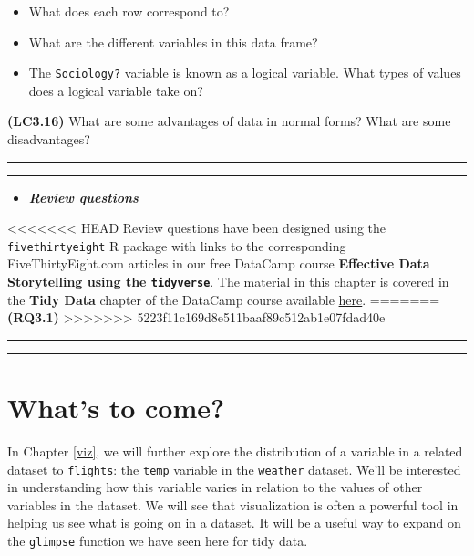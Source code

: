 \documentclass[]{tufte-book}
\let\oldrule=\rule
\renewcommand{\rule}[1]{\oldrule{\linewidth}}
\providecommand{\tightlist}{%
  \setlength{\itemsep}{0pt}\setlength{\parskip}{0pt}}
\newenvironment{rmdblock}[1]
  {\begin{shaded*}
  \begin{itemize}
  \renewcommand{\labelitemi}{
    \raisebox{-.7\height}[0pt][0pt]{
    }
  }
  \item
  }
  {
  \end{itemize}
  \end{shaded*}
  }
\newenvironment{review}
  {\begin{rmdblock}{warning}}
  {\end{rmdblock}}
\begin{document}
\begin{itemize}
\tightlist
\item
  What does each row correspond to?\\
\item
  What are the different variables in this data frame?\\
\item
  The \texttt{Sociology?} variable is known as a logical variable. What
  types of values does a logical variable take on?
\end{itemize}

\textbf{(LC3.16)} What are some advantages of data in normal forms? What
are some disadvantages?

\begin{center}\rule{0.5\linewidth}{\linethickness}\end{center}

\begin{center}\rule{0.5\linewidth}{\linethickness}\end{center}

\begin{review}
\textbf{\emph{Review questions}}
\end{review}

<<<<<<< HEAD
Review questions have been designed using the \texttt{fivethirtyeight} R
package \citep{R-fivethirtyeight} with links to the corresponding
FiveThirtyEight.com articles in our free DataCamp course
\textbf{Effective Data Storytelling using the \texttt{tidyverse}}. The
material in this chapter is covered in the \textbf{Tidy Data} chapter of
the DataCamp course available
\href{https://campus.datacamp.com/courses/effective-data-storytelling-using-the-tidyverse/tidy-data}{here}.
=======
\textbf{(RQ3.1)}
>>>>>>> 5223f11c169d8e511baaf89c512ab1e07fdad40e

\begin{center}\rule{0.5\linewidth}{\linethickness}\end{center}

\begin{center}\rule{0.5\linewidth}{\linethickness}\end{center}

\section{What's to come?}\label{whats-to-come}

In Chapter \ref{viz}, we will further explore the distribution of a
variable in a related dataset to \texttt{flights}: the \texttt{temp}
variable in the \texttt{weather} dataset. We'll be interested in
understanding how this variable varies in relation to the values of
other variables in the dataset. We will see that visualization is often
a powerful tool in helping us see what is going on in a dataset. It will
be a useful way to expand on the \texttt{glimpse} function we have seen
here for tidy data.
\end{document}
